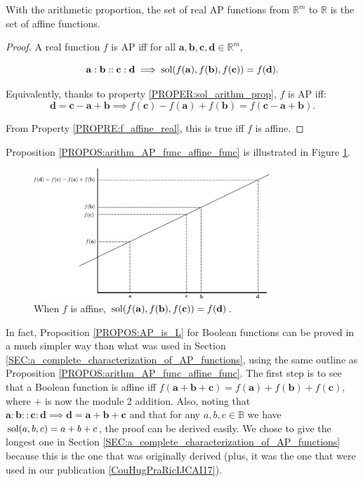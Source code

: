 \begin{proposition}
  \label{PROPOS:arithm_AP_func_affine_func}
  With the arithmetic proportion, the set of real AP functions from
  $\mathbb{R}^m$ to $\mathbb{R}$ is the set of affine functions.
\end{proposition}
\begin{proof}
  A real function $f$ is AP iff for all $\mathbf{a}, \mathbf{b}, \mathbf{c},
  \mathbf{d} \in \mathbb{R}^m$,

  $$\mathbf{a}: \mathbf{b}:: \mathbf{c}: \mathbf{d} \implies
  \text{sol}(f(\mathbf{a}), f(\mathbf{b}), f(\mathbf{c})) = f(\mathbf{d}).$$

  Equivalently, thanks to property \ref{PROPER:sol_arithm_prop},  $f$ is AP
  iff: $$\mathbf{d} = \mathbf{c} - \mathbf{a} + \mathbf{b} \implies
  f(\mathbf{c}) - f(\mathbf{a}) +  f(\mathbf{b}) = f( \mathbf{c} - \mathbf{a} +
  \mathbf{b}).$$

  From Property \ref{PROPRE:f_affine_real}, this is true iff $f$ is affine.
\end{proof}

Proposition \ref{PROPOS:arithm_AP_func_affine_func} is illustrated in Figure
\ref{FIG:real_AP_func}.
\begin{figure}[!h]
\centering
  \includegraphics[width=3.5in]{figures/real_AP_fuction.pdf}
  \caption{When $f$ is affine, $\text{sol}(f(\mathbf{a}), f(\mathbf{b}),
  f(\mathbf{c})) = f(\mathbf{d})$.}
\label{FIG:real_AP_func}
\end{figure}

In fact, Proposition \ref{PROPOS:AP_is_L} for Boolean functions can be
proved in a much simpler way than what was used in Section
\ref{SEC:a_complete_characterization_of_AP_functions}, using
the same outline as Proposition \ref{PROPOS:arithm_AP_func_affine_func}. The
first step is to see that a Boolean function is affine iff $f(\mathbf{a} +
\mathbf{b} + \mathbf{c}) = f(\mathbf{a}) + f(\mathbf{b}) + f(\mathbf{c})$,
where $+$ is now the module 2 addition. Also, noting that $\mathbf{a} :
\mathbf{b} :: \mathbf{c} : \mathbf{d} \implies \mathbf{d} = \mathbf{a} +
\mathbf{b} + \mathbf{c}$ and that for any $a, b, c \in \mathbb{B}$ we have
$\text{sol}(a, b, c) = a + b + c$, the proof can be derived easily. We chose to give
the longest one in Section
\ref{SEC:a_complete_characterization_of_AP_functions} because this is the one
that was originally derived (plus, it was the one that were used in our
publication \ref{CouHugPraRicIJCAI17}).

